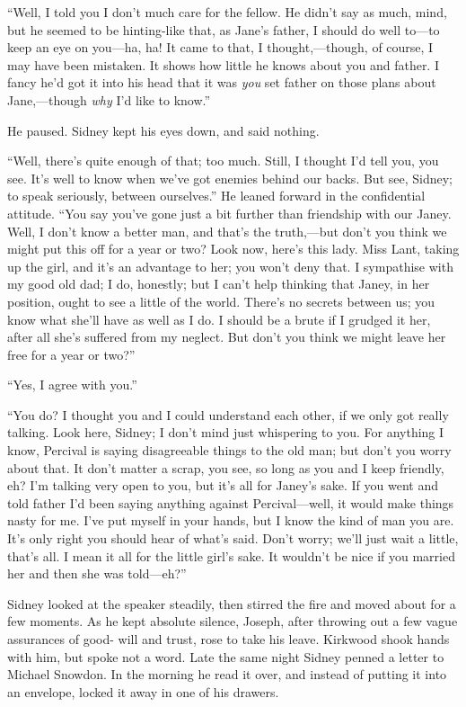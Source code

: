 ``Well, I told you I don't much care for the fellow. He didn't say as
much, mind, but he seemed to be hinting-like that, as Jane's father, I
should do well to---to keep an eye on you---ha, ha! It came to that, I
thought,---though, of course, I may have been mistaken. It shows how
little he knows about you and father. I fancy he'd got it into his head
that it was \emph{you} set father on those plans about Jane,---though
\emph{why} I'd like to know.''

{}He paused. Sidney kept his eyes down, and said nothing.

``Well, there's quite enough of that; too much. Still, I thought I'd
tell you, you see. It's well to know when we've got enemies behind our
backs. But see, Sidney; to speak seriously, between ourselves.'' He
leaned forward in the confidential attitude. ``You say you've gone just
a bit further than friendship with our Janey. Well, I don't know a
better man, and that's the truth,---but don't you think we might put
this off for a year or two? Look now, here's this lady. Miss Lant,
taking up the girl, and it's an advantage to her; you won't deny that. I
sympathise with my good old dad; I do, honestly; but I can't help
thinking that Janey, in her position, ought to see a little of the
world. There's no secrets between us; you know what she'll have as well
as I do. I should be a brute if I grudged it her, after all she's
suffered from my neglect. But don't you think we might leave her free
for a year or two?''

``Yes, I agree with you.''

{}``You do? I thought you and I could understand each other, if we only
got really talking. Look here, Sidney; I don't mind just whispering to
you. For anything I know, Percival is saying disagreeable things to the
old man; but don't you worry about that. It don't matter a scrap, you
see, so long as you and I keep friendly, eh? I'm talking very open to
you, but it's all for Janey's sake. If you went and told father I'd been
saying anything against Percival---well, it would make things nasty for
me. I've put myself in your hands, but I know the kind of man you are.
It's only right you should hear of what's said. Don't worry; we'll just
wait a little, that's all. I mean it all for the little girl's sake. It
wouldn't be nice if you married her and then she was told---eh?''

Sidney looked at the speaker steadily, then stirred the fire and moved
about for a few moments. As he kept absolute silence, Joseph, after
throwing out a few vague assurances of good- will and trust, rose to
take his leave. Kirkwood shook hands with him, but spoke {}not a word.
Late the same night Sidney penned a letter to Michael Snowdon. In the
morning he read it over, and instead of putting it into an envelope,
locked it away in one of his drawers.

